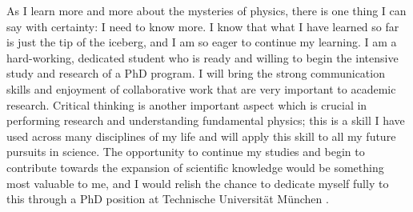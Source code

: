 \documentclass[11pt, a4paper]{awesome-cv}
\newcommand\uni{Technische Universit\"{a}t M\"{u}nchen }
\begin{document}
\begin{cvletter}
As I learn more and more about the mysteries of physics, there is one thing I can say with certainty: I need to know more. 
I know that what I have learned so far is just the tip of the iceberg, and I am so eager to continue my learning. 
I am a hard-working, dedicated student who is ready and willing to begin the intensive study and research of a PhD program. 
I will bring the strong communication skills and enjoyment of collaborative work that are very important to academic research. 
Critical thinking is another important aspect which is crucial in performing research and understanding fundamental physics; this is a skill I have used across many disciplines of my life and will apply this skill to all my future pursuits in science.
The opportunity to continue my studies and begin to contribute towards the expansion of scientific knowledge would be something most valuable to me, and I would relish the chance to dedicate myself fully to this through a PhD position at \uni. 

\end{cvletter}

\makeletterclosing
\end{document}
